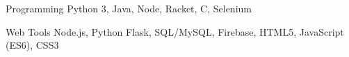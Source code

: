 

\begin{cvskills}

  \cvskill
  {Programming} %
  {Python 3, Java, Node, Racket, C, Selenium} %

  \cvskill
  {Web Tools} %
  {Node.js, Python Flask, SQL/MySQL, Firebase, HTML5, JavaScript (ES6), CSS3} %

\end{cvskills}
